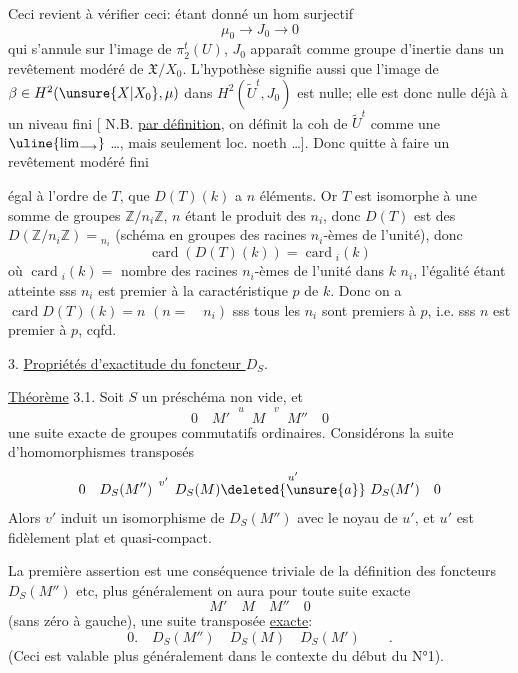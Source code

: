 Ceci revient à vérifier ceci: étant donné un hom surjectif
\[
 \mu_0\longrightarrow J_0\longrightarrow0
\]
qui s'annule sur l'image de $\pi_2^t(U)$,
 $J_0$ apparaît comme groupe d'inertie dans
un revêtement  modéré de $\mathfrak X/X_0$.
L'hypothèse signifie aussi que l'image de
$\beta\in H^2(\unsure{X|X_0},\mu)$ dans $H^2(\widetilde U^t,J_0)$
est nulle; elle est donc nulle déjà  à un
niveau fini [ N.B. \uline{par définition}, on définit la coh de
$\widetilde U^t$ comme une $\uline{\lim_{\longrightarrow}}$ \ldots,
  
mais seulement loc. noeth \ldots ]. Donc quitte à faire
un revêtement modéré fini

 égal à l'ordre de $T$, que $D(T)(k)$ a
 $n$ éléments. Or $T$ est isomorphe
à une somme de groupes $\mathbb Z/n_i\mathbb Z$, $n$ étant le
produit des $n_i$, donc $D(T)$ est 
 des $D(\mathbb Z/n_i\mathbb Z)={}_{n_i}$
(schéma en groupes des racines $n_i$-èmes de l'unité), donc
\[
 \operatorname{card}(D(T)(k))=\operatorname{card}{}_{i}(k)
\]
où $\operatorname{card}{}_{i}(k)=$ nombre des racines $n_i$-èmes de
l'unité dans $k$ \quad $n_i$, l'égalité étant atteinte sss $n_i$
est premier à la caractéristique $p$ de $k$. Donc on a
$\operatorname{card}D(T)(k)=n$
$(n=\quad n_i)$ sss tous les $n_i$ sont premiers à $p$, i.e. sss
$n$ est premier à $p$, cqfd.

3. \uline{Propriétés d'exactitude du foncteur $D_S$}.

\uline{Théorème} 3.1. Soit $S$ un préschéma non vide,
 et
\[
 0\quad M'\overset{u}{\phantom{\longrightarrow}}M
 \overset{v}{\phantom{\longrightarrow}}M''\quad0
\]
une suite exacte de groupes commutatifs ordinaires. Considérons
la suite d'homomorphismes transposés
\[
 0\quad D_S(M'')\overset{v'}{\phantom{\longrightarrow}}D_S(M)
 \overset{u'}{\deleted{\unsure{a}}}\ D_S(M')\quad0
\]
Alors $v'$ induit un isomorphisme de  $D_S(M'')$
avec le noyau de $u'$, et $u'$ est fidèlement plat et quasi-compact.

La première assertion est une conséquence triviale de la définition
des foncteurs $D_S(M'')$ etc, plus généralement on aura pour toute
suite exacte
\[
 M'\quad M\quad M''\quad0
\]
(sans zéro à gauche), une suite transposée \uline{exacte}:
\[
 0.\quad D_S(M'')\quad D_S(M)\quad D_S(M')\qquad.
\]
(Ceci est valable plus généralement dans le contexte du début du N°1).

